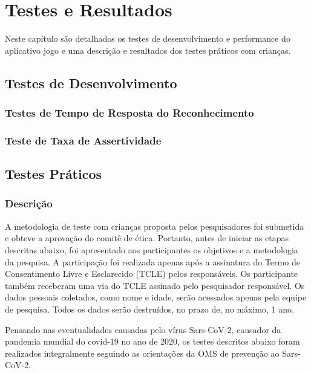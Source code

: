 \chapter{Testes e Resultados}\label{cap:conclusão}
Neste capítulo são detalhados os testes de desenvolvimento e performance do aplicativo jogo e uma descrição e resultados dos testes práticos com crianças.

\section{Testes de Desenvolvimento}


\subsection{\textbf{Testes de Tempo de Resposta do Reconhecimento}}



\subsection{\textbf{Teste de Taxa de Assertividade}}


\section{Testes Práticos}

\subsection{\textbf{Descrição}}


A metodologia de teste com crianças proposta pelos pesquisadores foi submetida e obteve a aprovação do comitê de ética. Portanto, antes de iniciar as etapas descritas abaixo, foi apresentado aos participantes os objetivos e a metodologia da pesquisa. A participação foi  realizada apenas após a assinatura do Termo de Consentimento Livre e Esclarecido (TCLE) pelos responsáveis. Os participante também receberam uma via do TCLE assinado pelo pesquisador responsável. Os dados pessoais coletados, como nome e idade, serão acessados apenas pela equipe de pesquisa. Todos os dados serão destruídos, no prazo de, no máximo, 1 ano.

Pensando nas eventualidades causadas pelo vírus Sars-CoV-2, causador da pandemia mundial do covid-19 no ano de 2020, os testes descritos abaixo foram realizados integralmente seguindo as orientações da OMS \cite{oms_2020} de prevenção ao Sars-CoV-2.

